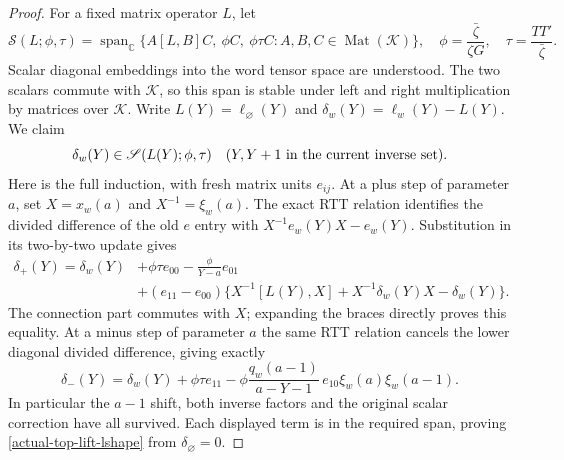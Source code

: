 \begin{proof}
For a fixed matrix operator $L$, let
\[
 \mathscr S(L;\phi,\tau)=\operatorname{span}_{\mathbb C}
  \{A[L,B]C,\ \phi C,\ \phi\tau C:
                       A,B,C\in\operatorname{Mat}(\mathcal K)\},
 \quad \phi=\frac{\bar\zeta}{\zeta G},\quad
 \tau=\frac{TT'}{\bar\zeta}.
\]
Scalar diagonal embeddings into the word tensor space are
understood.  The two scalars commute with $\mathcal K$, so
this span is stable under left and right multiplication
by matrices over $\mathcal K$.
Write $L(Y)=\ell_\varnothing(Y)$ and
$\delta_w(Y)=\ell_w(Y)-L(Y)$.  We claim
\begin{equation}\label{actual-top-lift-lshape}
 \delta_w(Y)\in\mathscr S(L(Y);\phi,\tau)
           \quad(Y,Y+1\hbox{ in the current inverse set}).
\end{equation}
Here is the full induction, with fresh matrix units
$e_{ij}$.  At a plus step of parameter $a$, set
$X=x_w(a)$ and $X^{-1}=\xi_w(a)$.  The exact RTT relation
identifies the divided difference of the old $e$ entry
with $X^{-1}e_w(Y)X-e_w(Y)$.  Substitution in its two-by-two
update gives
\begin{align}
 \delta_{+}(Y)=\delta_w(Y)&+\phi\tau e_{00}
             -\frac{\phi}{Y-a}e_{01}\nonumber\\
 &+(e_{11}-e_{00})
    \{X^{-1}[L(Y),X]+X^{-1}\delta_w(Y)X-\delta_w(Y)\}.
                                                    \label{actual-top-lift-plusshape}
\end{align}
The connection part commutes with $X$; expanding the
braces directly proves this equality.  At a minus step
of parameter $a$ the same RTT relation cancels the lower
diagonal divided difference, giving exactly
\begin{equation}\label{actual-top-lift-minusshape}
 \delta_-(Y)=\delta_w(Y)+\phi\tau e_{11}
 -\phi\frac{q_w(a-1)}{a-Y-1}\,
                      e_{10}\xi_w(a)\xi_w(a-1).
\end{equation}
In particular the $a-1$ shift, both inverse factors and
the original scalar correction have all survived.
Each displayed term is in the required span, proving
\eqref{actual-top-lift-lshape} from $\delta_\varnothing=0$.


\end{proof}
